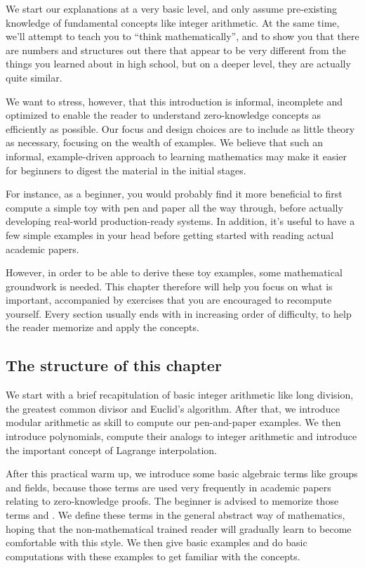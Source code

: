 We start our explanations at a very basic level, and only assume pre-existing knowledge of fundamental concepts like integer arithmetic. At the same time, we'll attempt to teach you to ``think mathematically'', and to show you that there are numbers and  structures out there that appear to be very different from the things you learned about in high school, but on a deeper level, they are actually quite similar.

We want to stress, however, that this introduction is informal, incomplete and optimized to enable the reader to understand zero-knowledge concepts as efficiently as possible. Our focus and design choices are to include as little theory as necessary, focusing on  the wealth of  examples. We believe that such an informal, example-driven approach to learning mathematics may make it easier for beginners to digest the material in the initial stages. 

For instance, as a beginner, you would probably find it more beneficial to first compute a simple toy  with pen and paper all the way through, before actually developing real-world production-ready systems. In addition, it's useful to have a few simple examples in your head before getting started with reading actual academic papers.

However, in order to be able to derive these toy examples, some mathematical groundwork is needed. This chapter therefore will help you focus on what is important, accompanied by exercises that you are encouraged to recompute yourself. Every section usually ends with  in increasing order of difficulty, to help the reader memorize and apply the concepts. 


\subsection{The structure of this chapter}

We start with a brief recapitulation of basic integer arithmetic like long division, the greatest common divisor and Euclid's algorithm. After that, we introduce modular arithmetic as  skill to compute our pen-and-paper examples. We then introduce polynomials, compute their analogs to integer arithmetic and introduce the important concept of Lagrange interpolation.

After this practical warm up, we introduce some basic algebraic terms like groups and fields, because those terms are used very frequently in academic papers relating to zero-knowledge proofs. The beginner is  advised to memorize those terms and . We define these terms in the general abstract way of mathematics, hoping that the non-mathematical trained reader will gradually learn to become comfortable with this style. We then give basic examples and do basic computations with these examples to get familiar with the concepts. 

